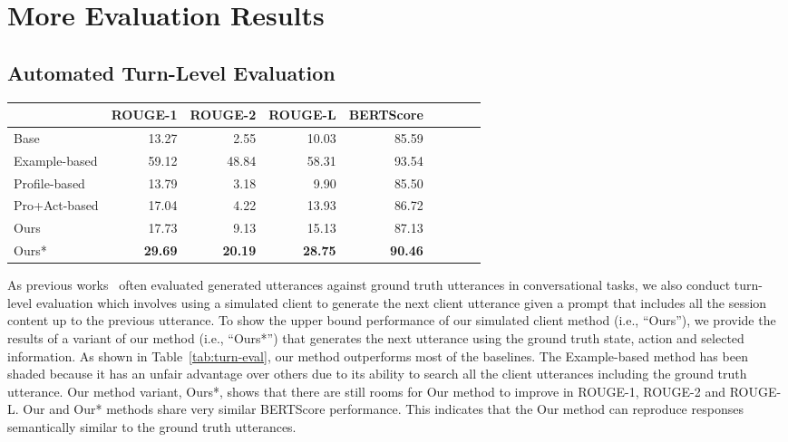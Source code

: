 \section{More Evaluation Results}
\label{app:more evaluation}

\subsection{Automated Turn-Level Evaluation}

\begin{table*}[tb]
\centering
\begin{tabular}{lrrrrrrrr}
\toprule
             & ROUGE-1 & ROUGE-2 & ROUGE-L & BERTScore \\ \midrule
Base         & 13.27   & 2.55    & 10.03   & 85.59     \\
\rowcolor[HTML]{D8D6D6} Example-based & 59.12   & 48.84   & 58.31   & 93.54     \\
Profile-based & 13.79   & 3.18    & 9.90    & 85.50     \\
Pro+Act-based & 17.04   & 4.22    & 13.93   & 86.72     \\ \hline
Ours         & 17.73   & 9.13    & 15.13   & 87.13     \\
Ours*        & \textbf{29.69}   & \textbf{20.19}   & \textbf{28.75}   & \textbf{90.46}  \\ \bottomrule
\end{tabular}
\caption{Results of turn-level evaluation. ``Our'' refers to our client simulation method. ``Ours*'' refers to a variant of our method provided with ground truth states, actions, and selected information. Other than Example-based method, our framework outperforms the remaining baseline methods.}
\label{tab:turn-eval}
\end{table*}

As previous works~\citep{wang2024towards,deng2023prompting,kang2024can} often evaluated generated utterances against ground truth utterances in conversational tasks, we also conduct turn-level evaluation which involves using a simulated client to generate the next client utterance given a prompt that includes all the session content up to the previous utterance. To show the upper bound performance of our simulated client method (i.e., ``Ours''), we provide the results of a variant of our method (i.e., ``Ours*'') that generates the next utterance using the ground truth state, action and selected information. As shown in Table~\ref{tab:turn-eval}, our method outperforms most of the baselines. The Example-based method has been shaded because it has an unfair advantage over others due to its ability to search all the client utterances including the ground truth utterance. Our method variant, Ours*, shows that there are still rooms for Our method to improve in ROUGE-1, ROUGE-2 and ROUGE-L. Our and Our* methods share very similar BERTScore performance. This indicates that the Our method can reproduce responses semantically similar to the ground truth utterances. 

